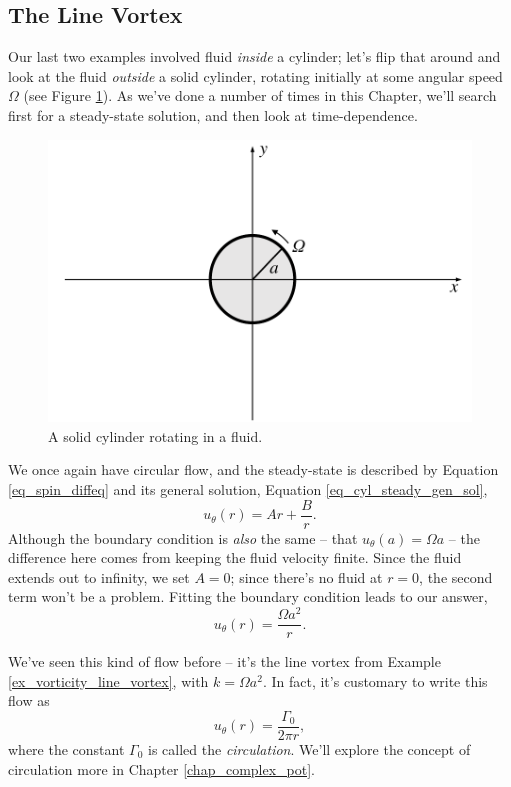 \subsection{The Line Vortex}
\label{sec_line_vortex}

Our last two examples involved fluid \emph{inside} a cylinder; let's flip that around and look at the fluid \emph{outside} a solid cylinder, rotating initially at some angular speed $\Omega$ (see Figure \ref{fig_line_setup}).  As we've done a number of times in this Chapter, we'll search first for a steady-state solution, and then look at time-dependence.

\begin{figure}
\centering
\includegraphics[width=0.7\linewidth]{Figures/Chapter2/fig_line_setup}
\caption{A solid cylinder rotating in a fluid.}
\label{fig_line_setup}
\end{figure}

We once again have circular flow, and the steady-state is described by Equation \ref{eq_spin_diffeq} and its general solution, Equation \ref{eq_cyl_steady_gen_sol},
\[
u_\theta (r) = Ar + \frac{B}{r}.
\]
Although the boundary condition is \emph{also} the same -- that $u_\theta(a) = \Omega a$ -- the difference here comes from keeping the fluid velocity finite.  Since the fluid extends out to infinity, we set $A = 0$; since there's no fluid at $r=0$, the second term won't be a problem.  Fitting the boundary condition leads to our answer,
\[
u_\theta(r) = \frac{\Omega a^2}{r}.
\]

We've seen this kind of flow before -- it's the line vortex from Example \ref{ex_vorticity_line_vortex}, with $k=\Omega a^2$.  In fact, it's customary to write this flow as
\begin{equation}
\label{eq_line_vortex}
u_\theta(r) = \frac{\Gamma_0}{2\pi r},
\end{equation}
where the constant $\Gamma_0$ is called the \emph{circulation}.  We'll explore the concept of circulation more in Chapter \ref{chap_complex_pot}.

